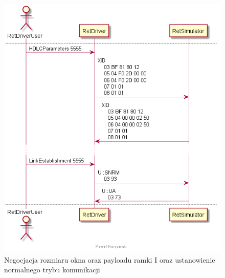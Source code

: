     \begin{figure}[h!]
    \centering
    \includegraphics[scale=0.75]{out/Diagramy/UML_DiagramOfSequence_New/RetCalibration-page3.png}
    \caption{Negocjacja rozmiaru okna oraz payloadu ramki I oraz ustanowienie normalnego trybu komunikacji}
    \end{figure}

